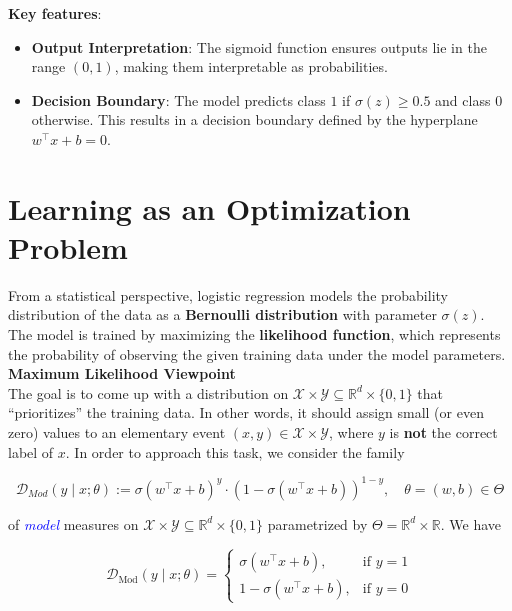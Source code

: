 \textbf{Key features}:
\begin{itemize}
    \item \textbf{Output Interpretation}: The sigmoid function ensures outputs lie in the range $(0, 1)$, making them interpretable as probabilities.
    \item \textbf{Decision Boundary}: The model predicts class $1$ if $\sigma(z) \geq 0.5$ and class $0$ otherwise. This results in a decision boundary defined by the hyperplane $w^\top x + b = 0$.\cite{hastie2009elements}
\end{itemize}

\section{Learning as an Optimization Problem}
From a statistical perspective, logistic regression models the probability distribution of the data as a \textbf{Bernoulli distribution} with parameter $\sigma(z)$. The model is trained by maximizing the \textbf{likelihood function}, which represents the probability of observing the given training data under the model parameters.\\

\textbf{Maximum Likelihood Viewpoint}\\

The goal is to come up with a distribution on $\mathcal{X} \times \mathcal{Y} \subseteq \mathbb{R}^d \times \{0,1\}$ that “prioritizes” the training data. In other words, it should assign small (or even zero) values to an elementary event $(x, y) \in \mathcal{X} \times \mathcal{Y}$, where $y$ is \textbf{not} the correct label of $x$. In
order to approach this task, we consider the family

\begin{equation}
    \mathcal{D}_{Mod}(y \mid x;\theta) := \sigma(w^\top x +b)^y \cdot (1 - \sigma(w^\top x +b))^{1-y}, \quad \theta = (w, b) \in \Theta
    \label{eqn:2}
\end{equation}

of \textcolor{blue}{\emph{model}} measures on $\mathcal{X} \times \mathcal{Y} \subseteq \mathbb{R}^d \times \{0,1\}$ parametrized by $\Theta= \mathbb{R}^d \times \mathbb{R}$. We have

\begin{equation}
    \mathcal{D}_{\text{Mod}}(y \mid x; \theta) =
    \begin{cases} 
        \sigma(w^\top x + b), & \text{if } y = 1 \\
        1 - \sigma(w^\top x + b), & \text{if } y = 0
    \end{cases}
    \label{eqn:3}
\end{equation}

